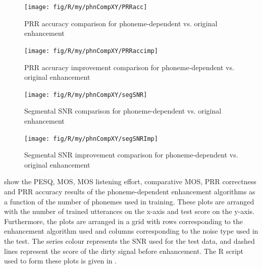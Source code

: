 \begin{figure}[h]
\noindent \begin{centering}
\texttt{[image: fig/R/my/phnCompXY/PRRacc]}
\par\end{centering}

\protect\caption{\label{fig:prracc-comparison-phn}\acs{PRR} accuracy comparison for
phoneme-dependent vs. original enhancement}
\end{figure}


\begin{figure}[h]
\noindent \begin{centering}
\texttt{[image: fig/R/my/phnCompXY/PRRaccimp]}
\par\end{centering}

\protect\caption{\label{fig:prraccimp-comparison-phn}\acs{PRR} accuracy improvement
comparison for phoneme-dependent vs. original enhancement}
\end{figure}


\begin{figure}[h]
\noindent \begin{centering}
\texttt{[image: fig/R/my/phnCompXY/segSNR]}
\par\end{centering}

\protect\caption{\label{fig:segsnr-comparison-phn}Segmental \acs{SNR} comparison
for phoneme-dependent vs. original enhancement}
\end{figure}


\begin{figure}[h]
\noindent \begin{centering}
\texttt{[image: fig/R/my/phnCompXY/segSNRImp]}
\par\end{centering}

\protect\caption{\label{fig:segsnrimp-comparison-phn}Segmental \acs{SNR} improvement
comparison for phoneme-dependent vs. original enhancement}
\end{figure}


show the \ac{PESQ}, \ac{MOS}, \ac{MOS} listening effort, comparative
\ac{MOS}, \ac{PRR} correctness and \ac{PRR} accuracy results of
the phoneme-dependent enhancement algorithms as a function of the
number of phonemes used in training. These plots are arranged with
the number of trained utterances on the x-axis and test score on the
y-axis. Furthermore, the plots are arranged in a grid with rows corresponding
to the enhancement algorithm used and columns corresponding to the
noise type used in the test. The series colour represents the \ac{SNR}
used for the test data, and dashed lines represent the score of the
dirty signal before enhancement. The R script used to form these plots
is given in .

